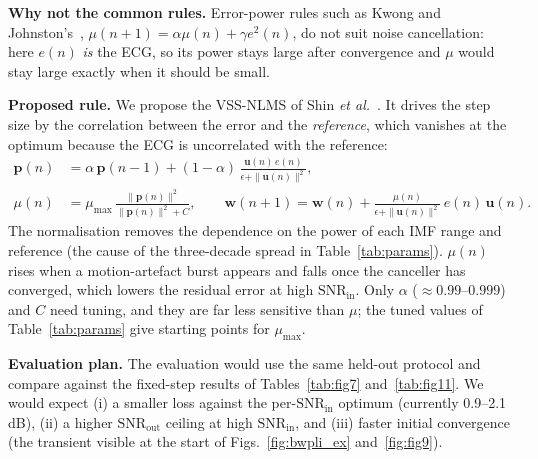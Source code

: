 \documentclass[11pt,a4paper]{article}
\newcommand{\snrin}{\mathrm{SNR}_\mathrm{in}}
\newcommand{\snrout}{\mathrm{SNR}_\mathrm{out}}
\begin{document}
\textbf{Why not the common rules.} Error-power rules such as Kwong and Johnston's~\cite{kwong}, $\mu(n{+}1)=\alpha\mu(n)+\gamma e^2(n)$, do not suit noise cancellation: here $e(n)$ \emph{is} the ECG, so its power stays large after convergence and $\mu$ would stay large exactly when it should be small.

\textbf{Proposed rule.} We propose the VSS-NLMS of Shin \emph{et al.}~\cite{shin}. It drives the step size by
the correlation between the error and the \emph{reference}, which vanishes at the optimum because the ECG is
uncorrelated with the reference:
\begin{align}
  \mathbf{p}(n) &= \alpha\,\mathbf{p}(n{-}1) + (1-\alpha)\,\frac{\mathbf{u}(n)\,e(n)}{\epsilon+\|\mathbf{u}(n)\|^2},\\
  \mu(n) &= \mu_{\max}\,\frac{\|\mathbf{p}(n)\|^2}{\|\mathbf{p}(n)\|^2 + C}, \qquad
  \mathbf{w}(n{+}1)=\mathbf{w}(n)+\frac{\mu(n)}{\epsilon+\|\mathbf{u}(n)\|^2}\,e(n)\,\mathbf{u}(n).
\end{align}
The normalisation removes the dependence on the power of each IMF range and reference (the cause of the three-decade spread in Table~\ref{tab:params}). $\mu(n)$ rises when a motion-artefact burst appears and falls once the canceller has converged, which lowers the residual error at high $\snrin$. Only $\alpha$ ($\approx0.99$--$0.999$) and $C$ need tuning, and they are far less sensitive than $\mu$; the tuned values of Table~\ref{tab:params} give starting points for $\mu_{\max}$.

\textbf{Evaluation plan.} The evaluation would use the same held-out protocol and compare against the fixed-step
results of Tables~\ref{tab:fig7} and~\ref{tab:fig11}. We would expect (i) a smaller loss against the per-$\snrin$
optimum (currently 0.9--2.1\,dB), (ii) a higher $\snrout$ ceiling at high $\snrin$, and (iii) faster initial
convergence (the transient visible at the start of Figs.~\ref{fig:bwpli_ex} and~\ref{fig:fig9}).
\end{document}
